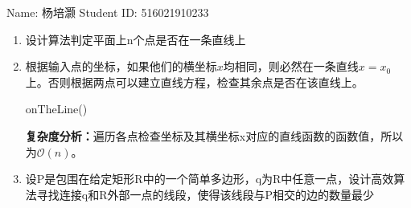 \documentclass[12pt,a4paper]{article}
\makeatletter
\newtheorem*{solution}{Solution}
\theoremstyle{definition}
\renewenvironment{solution}[1][Solution] {\par\pushQED{\qed}\normalfont\topsep6\p@\@plus6\p@\relax\trivlist\item[\hskip\labelsep\bfseries#1\@addpunct{.}]\ignorespaces}{\popQED\endtrivlist\@endpefalse} \makeatother
\makeatother
\begin{document}
\noindent

\noindent{}
\begin{center}

\footnotesize{\color{black} Name: 杨培灏  \quad Student ID: 516021910233}
\end{center}

\begin{enumerate}

\item 设计算法判定平面上n个点是否在一条直线上
\begin{solution}
	根据输入点的坐标，如果他们的横坐标$x$均相同，则必然在一条直线$x=x_0$上。否则根据两点可以建立直线方程，检查其余点是否在该直线上。
	\begin{algorithm}
		\caption{onTheLine()}
	\end{algorithm}
	\textbf{复杂度分析：}遍历各点检查坐标及其横坐标x对应的直线函数的函数值，所以为$\mathcal{O}(n)$。
\end{solution}

\item 设P是包围在给定矩形R中的一个简单多边形，q为R中任意一点，设计高效算法寻找连接q和R外部一点的线段，使得该线段与P相交的边的数量最少


\end{enumerate}
\end{document}

